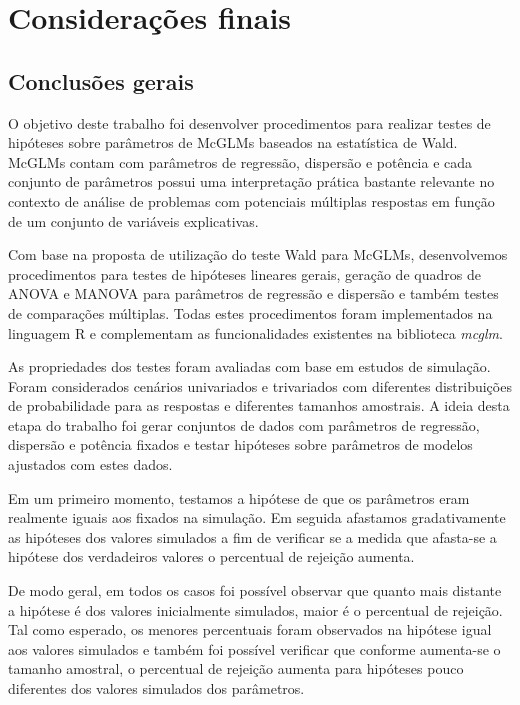 
\chapter{Considerações finais}


\section{Conclusões gerais}

O objetivo deste trabalho foi desenvolver procedimentos para realizar testes de hipóteses sobre parâmetros de McGLMs baseados na estatística de Wald. McGLMs contam com parâmetros de regressão, dispersão e potência e cada conjunto de parâmetros possui uma interpretação prática bastante relevante no contexto de análise de problemas com potenciais múltiplas respostas em função de um conjunto de variáveis explicativas.

Com base na proposta de utilização do teste Wald para McGLMs, desenvolvemos procedimentos para testes de hipóteses lineares gerais, geração de quadros de ANOVA e MANOVA para parâmetros de regressão e dispersão e também testes de comparações múltiplas. Todas estes procedimentos foram implementados na linguagem R e complementam as funcionalidades existentes na biblioteca \emph{mcglm}.

As propriedades dos testes foram avaliadas com base em estudos de simulação. Foram considerados cenários univariados e trivariados com diferentes distribuições de probabilidade para as respostas e diferentes tamanhos amostrais. A ideia desta etapa do trabalho foi gerar conjuntos de dados com parâmetros de regressão, dispersão e potência fixados e testar hipóteses sobre parâmetros de modelos ajustados com estes dados. 

Em um primeiro momento, testamos a hipótese de que os parâmetros eram realmente iguais aos fixados na simulação. Em seguida afastamos gradativamente as hipóteses dos valores simulados a fim de verificar se a medida que afasta-se a hipótese dos verdadeiros valores o percentual de rejeição aumenta. 

De modo geral, em todos os casos foi possível observar que quanto mais distante a hipótese é dos valores inicialmente simulados, maior é o percentual de rejeição. Tal como esperado, os menores percentuais foram observados na hipótese igual aos valores simulados e também foi possível verificar que conforme aumenta-se o tamanho amostral, o percentual de rejeição aumenta para hipóteses pouco diferentes dos valores simulados dos parâmetros.


